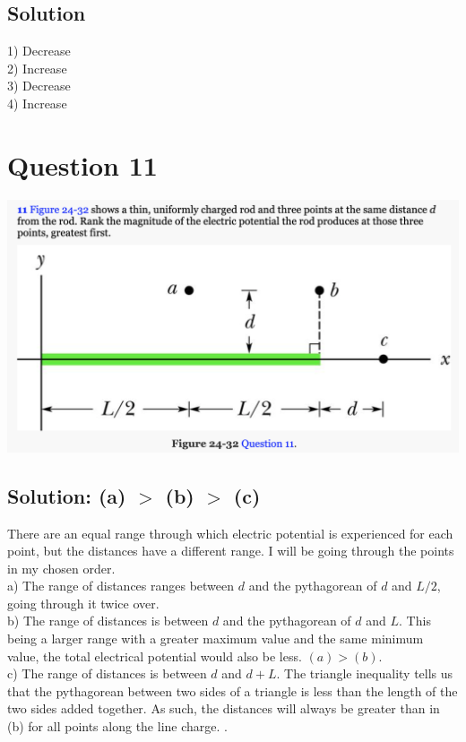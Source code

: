 \documentclass[12pt]{article}
\begin{document}
\subsection{Solution}
1) Decrease\\
2) Increase\\
3) Decrease\\
4) Increase
\pagebreak

\section{Question 11}
\includegraphics[width=\textwidth]{picture_4.png}

\subsection*{Solution: (a) $>$ (b) $>$ (c)}
There are an equal range through which electric potential is experienced for each point, but the distances have a different range.
I will be going through the points in my chosen order.\\
a) The range of distances ranges between $d$ and the pythagorean of $d$ and $L/2$, going through it twice over.\\
b) The range of distances is between $d$ and the pythagorean of $d$ and $L$. This being a larger range with a greater maximum value and the same minimum value, the total electrical potential would also be less. $(a) > (b)$.\\
c) The range of distances is between $d$ and $d + L$.  The triangle inequality tells us that the pythagorean between two sides of a triangle is less than the length of the two sides added together. As such, the distances will always be greater than in (b) for all points along the line charge. .
\pagebreak
\end{document}
